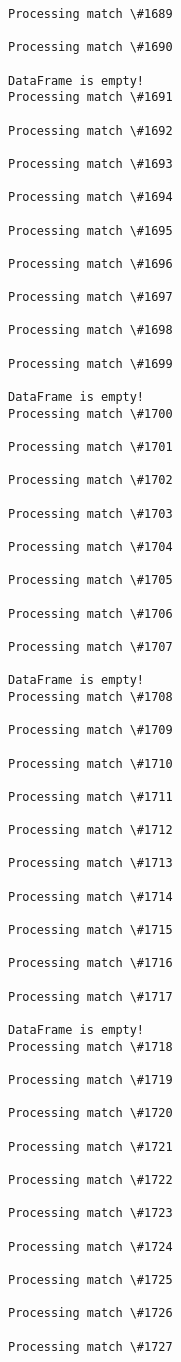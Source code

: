 \documentclass[11pt]{article}
\begin{document}
\begin{Verbatim}[commandchars=\\\{\}]
Processing match \#1689

Processing match \#1690

DataFrame is empty!
Processing match \#1691

Processing match \#1692

Processing match \#1693

Processing match \#1694

Processing match \#1695

Processing match \#1696

Processing match \#1697

Processing match \#1698

Processing match \#1699

DataFrame is empty!
Processing match \#1700

Processing match \#1701

Processing match \#1702

Processing match \#1703

Processing match \#1704

Processing match \#1705

Processing match \#1706

Processing match \#1707

DataFrame is empty!
Processing match \#1708

Processing match \#1709

Processing match \#1710

Processing match \#1711

Processing match \#1712

Processing match \#1713

Processing match \#1714

Processing match \#1715

Processing match \#1716

Processing match \#1717

DataFrame is empty!
Processing match \#1718

Processing match \#1719

Processing match \#1720

Processing match \#1721

Processing match \#1722

Processing match \#1723

Processing match \#1724

Processing match \#1725

Processing match \#1726

Processing match \#1727


\end{Verbatim}
\end{document}
